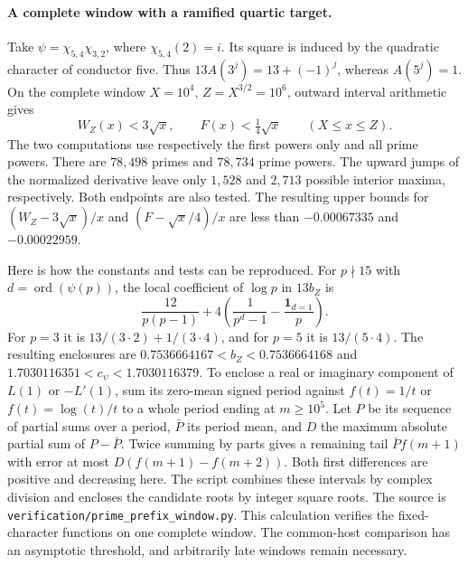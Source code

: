 \paragraph{A complete window with a ramified quartic target.}
Take \(\psi=\chi_{5,4}\chi_{3,2}\), where
\(\chi_{5,4}(2)=i\). Its square is induced by the quadratic
character of conductor five. Thus \(13A(3^j)=13+(-1)^j\),
whereas \(A(5^j)=1\). On the complete window \(X=10^4\),
\(Z=X^{3/2}=10^6\), outward interval arithmetic gives
\[
              W_Z(x)<3\sqrt{x},\qquad F(x)<\tfrac14\sqrt{x}
                    \qquad(X\le x\le Z).
\]
The two computations use respectively the first powers only and all
prime powers. There are \(78{,}498\) primes and \(78{,}734\) prime
powers. The upward jumps of the normalized derivative leave only
\(1{,}528\) and \(2{,}713\) possible interior maxima, respectively.
Both endpoints are also tested. The resulting upper bounds for
\((W_Z-3\sqrt{x})/x\) and \((F-\sqrt{x}/4)/x\) are less than
\(-0.00067335\) and \(-0.00022959\).

Here is how the constants and tests can be reproduced. For
\(p\nmid15\) with \(d=\operatorname{ord}(\psi(p))\), the local
coefficient of \(\log p\) in \(13b_Z\) is
\[
    \frac{12}{p(p-1)}+
       4\left(\frac1{p^d-1}-\frac{\mathbf1_{d=1}}p\right).
\]
For \(p=3\) it is \(13/(3\cdot2)+1/(3\cdot4)\), and for \(p=5\)
it is \(13/(5\cdot4)\). The resulting enclosures are
\(0.7536664167<b_Z<0.7536664168\) and
\(1.7030116351<c_\psi<1.7030116379\).
To enclose a real or imaginary component of \(L(1)\) or \(-L'(1)\),
sum its zero-mean signed period against \(f(t)=1/t\) or
\(f(t)=\log(t)/t\) to a whole period ending at \(m\ge10^5\).
Let \(P\) be its sequence of partial sums over a period, \(\bar P\)
its period mean, and \(D\) the maximum absolute partial sum of
\(P-\bar P\). Twice summing by parts gives a remaining tail
\(\bar P f(m+1)\) with error at most
\(D(f(m+1)-f(m+2))\). Both first differences are positive and
decreasing here. The script combines these intervals by complex
division and encloses the candidate roots by integer square roots.
The source is \texttt{verification/prime\_prefix\_window.py}.
This calculation verifies the fixed-character functions on one
complete window. The common-host comparison has an asymptotic
threshold, and arbitrarily late windows remain necessary.
